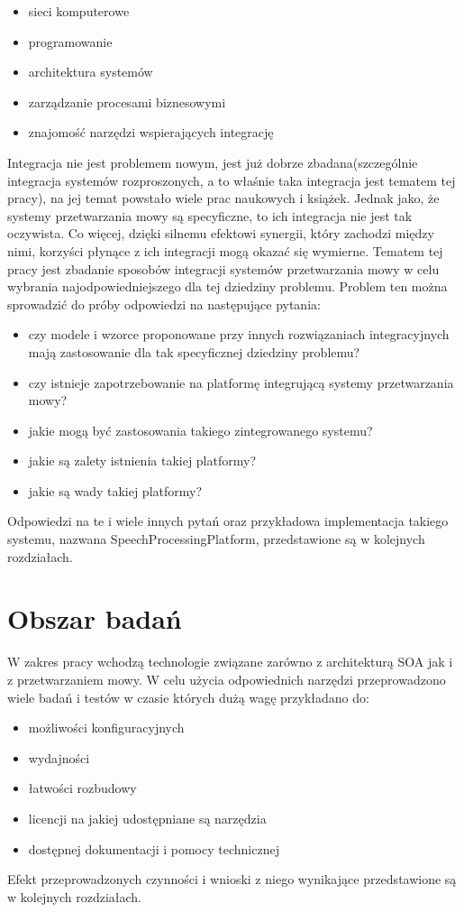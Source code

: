  \begin{itemize}
	\item sieci komputerowe
	\item programowanie
	\item architektura systemów
	\item zarządzanie procesami biznesowymi
	\item znajomość narzędzi wspierających integrację
\end{itemize}   
Integracja nie jest problemem nowym, jest już dobrze zbadana(szczególnie integracja systemów rozproszonych, a to właśnie taka integracja jest tematem tej pracy), na jej temat powstało wiele prac naukowych i książek. Jednak jako, że systemy przetwarzania mowy są specyficzne, to ich integracja nie jest tak oczywista. Co więcej, dzięki silnemu efektowi synergii, który zachodzi między nimi, korzyści płynące z ich integracji mogą okazać się wymierne. Tematem tej pracy jest zbadanie sposobów integracji systemów przetwarzania mowy w celu wybrania najodpowiedniejszego dla tej dziedziny problemu. Problem ten można sprowadzić do próby odpowiedzi na następujące pytania:
 \begin{itemize}
	\item  czy modele i wzorce proponowane przy innych rozwiązaniach integracyjnych mają zastosowanie dla tak specyficznej dziedziny problemu?
	\item czy istnieje zapotrzebowanie na platformę integrującą systemy przetwarzania mowy?
	\item jakie mogą być zastosowania takiego zintegrowanego systemu?
	\item jakie są zalety istnienia takiej platformy?
	\item jakie są wady takiej platformy?
\end{itemize}  
Odpowiedzi na te i wiele innych pytań oraz przykładowa implementacja takiego systemu, nazwana SpeechProcessingPlatform,  przedstawione są w kolejnych rozdziałach.

\section{Obszar badań} %
W zakres pracy wchodzą technologie związane zarówno z architekturą SOA jak i z przetwarzaniem mowy. W celu użycia odpowiednich narzędzi przeprowadzono wiele badań i testów w czasie których dużą wagę przykładano do:
\begin{itemize}
 	\item możliwości konfiguracyjnych
	\item wydajności
	\item łatwości rozbudowy
	\item licencji na jakiej udostępniane są narzędzia
	\item dostępnej dokumentacji i pomocy technicznej
\end{itemize}
Efekt przeprowadzonych czynności i wnioski z niego wynikające przedstawione są w kolejnych rozdziałach.



